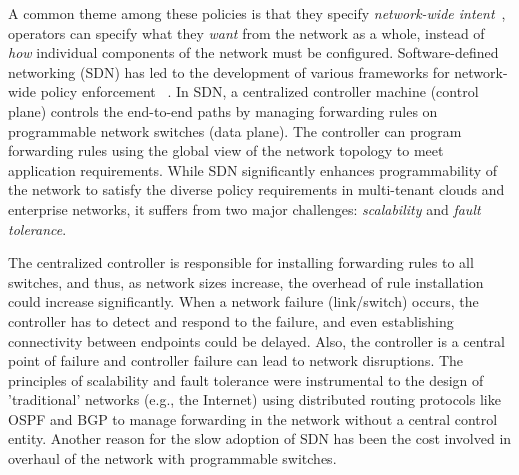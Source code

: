 
A common theme among these policies is that 
they specify \emph{network-wide intent}~\cite{intent},
operators can specify what they \emph{want} from the network as a 
whole, instead of \emph{how} individual components of the network
must be configured. 
Software-defined networking (SDN) has led to the development 
of various frameworks for network-wide policy enforcement
~\cite{netkat, simple, merlin, fattire, genesis}. In SDN,
a centralized controller machine (control plane) controls
the end-to-end paths by managing forwarding rules on programmable
network switches (data plane). The controller can program
forwarding rules using the global view of the network
topology to meet application requirements. While SDN 
significantly enhances programmability of the network to 
satisfy the diverse policy requirements in multi-tenant
clouds and enterprise networks, it suffers from two 
major challenges: 
\emph{scalability} and \emph{fault tolerance}. 

The centralized controller is responsible for installing 
forwarding rules to all switches, and thus, as network sizes
increase, the overhead of rule installation could increase
significantly. When a network failure (link/switch) occurs,
the controller has to detect and respond to the failure, and
even establishing connectivity between endpoints could be delayed.
Also, the controller is a central point of failure and controller
failure can lead to network disruptions. 
The principles of scalability and fault tolerance 
were instrumental to the design
of 'traditional' networks (e.g., the Internet) using distributed
routing protocols like OSPF and BGP to manage forwarding in the 
network without a central control entity. Another reason for the 
slow adoption of SDN has been the cost involved in overhaul 
of the network with programmable switches.  

